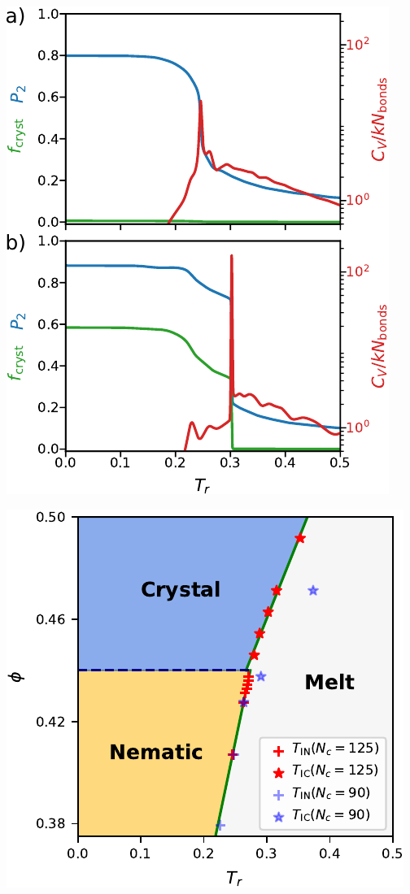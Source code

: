 \documentclass[aspectratio=169]{beamer}
\begin{document}
\begin{frame}[c]{}

  \centering
  \includegraphics[height=\textheight]{../figures/ch5_soft_from_diss/figs-hard_step/fig-WLMC_side_phi/fig-WLMC.pdf}

\end{frame}

\begin{frame}[c]{}

  \centering
  \includegraphics[height=\textheight]{../figures/ch5_soft_from_diss/figs-hard_step/fig-phase_diag_Nc/fig-phase_diag.pdf}

\end{frame}
\end{document}
